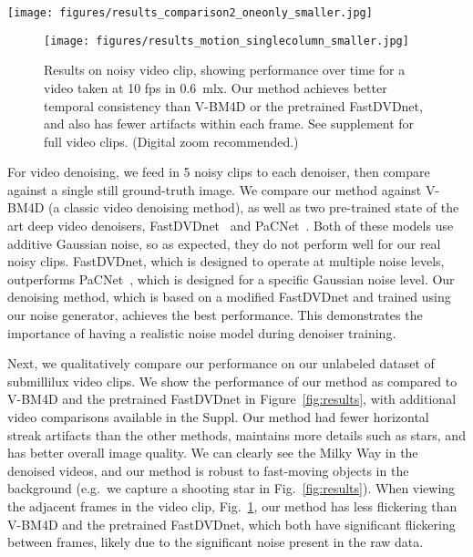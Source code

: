 \documentclass[final]{cvpr}
\begin{document}
\begin{figure*}[thb]
\centering
\texttt{[image: figures/results\_comparison2\_oneonly\_smaller.jpg]}
   \caption{Results on noisy video clips taken at 10 fps in 0.0006~\si{\lux}. The input sequence (left), V-BM4D, pretrained FastDVDnet, and our results are shown. Our method maintains more details throughout the clip and does not contain the prevalent streaking artifacts that are present in V-BM4D and the pretrained FastDVDnet. See supplement for full video clips. (Digital zoom recommended.)}
\label{fig:results}
\vspace{-4mm}
\end{figure*}


\begin{figure}[thb]
\centering
\texttt{[image: figures/results\_motion\_singlecolumn\_smaller.jpg]}
   \caption{Results on noisy video clip, showing performance over time for a video taken at 10 fps in 0.6~\si{\milli\lux}. Our method achieves better temporal consistency than V-BM4D or the pretrained FastDVDnet, and also has fewer artifacts within each frame. See supplement for full video clips. (Digital zoom recommended.)}
\label{fig:results_motion}
\vspace{-8mm}
\end{figure}

For video denoising, we feed in 5 noisy clips to each denoiser, then compare against a single still ground-truth image. We compare our method against V-BM4D (a classic video denoising method), as well as two pre-trained state of the art deep video denoisers, FastDVDnet~\cite{tassano2020fastdvdnet} and PaCNet~\cite{vaksman2021patch}. Both of these models use additive Gaussian noise, so as expected, they do not perform well for our real noisy clips. FastDVDnet, which is designed to operate at multiple noise levels, outperforms PaCNet~\cite{vaksman2021patch}, which is designed for a specific Gaussian noise level. Our denoising method, which is based on a modified FastDVDnet and trained using our noise generator, achieves the best performance. This demonstrates the importance of having a realistic noise model during denoiser training.










Next, we qualitatively compare our performance on our unlabeled dataset of submillilux video clips. We show the performance of our method as compared to V-BM4D and the pretrained FastDVDnet in Figure~\ref{fig:results}, with additional video comparisons available in the Suppl. Our method had fewer horizontal streak artifacts than the other methods, maintains more details such as stars, and has better overall image quality. We can clearly see the Milky Way in the denoised videos, and our method is robust to fast-moving objects in the background (e.g.\ we capture a shooting star in Fig.~\ref{fig:results}). When viewing the adjacent frames in the video clip, Fig.~\ref{fig:results_motion}, our method has less flickering than V-BM4D and the pretrained FastDVDnet, which both have significant flickering between frames, likely due to the significant noise present in the raw data. 
\end{document}
